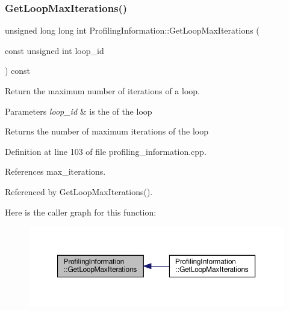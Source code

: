 \subsubsection{\texorpdfstring{Get\+Loop\+Max\+Iterations()}{GetLoopMaxIterations()}\hspace{0.1cm}{\footnotesize\ttfamily [1/2]}}
{\footnotesize\ttfamily unsigned long long int Profiling\+Information\+::\+Get\+Loop\+Max\+Iterations (\begin{DoxyParamCaption}\item[{const unsigned int}]{loop\+\_\+id }\end{DoxyParamCaption}) const}



Return the maximum number of iterations of a loop. 


\begin{DoxyParams}{Parameters}
{\em loop\+\_\+id} & is the of the loop \\
\hline
\end{DoxyParams}
\begin{DoxyReturn}{Returns}
the number of maximum iterations of the loop 
\end{DoxyReturn}


Definition at line 103 of file profiling\+\_\+information.\+cpp.



References max\+\_\+iterations.



Referenced by Get\+Loop\+Max\+Iterations().

Here is the caller graph for this function\+:
\nopagebreak
\begin{figure}[H]
\begin{center}
\leavevmode
\includegraphics[width=350pt]{dd/d5b/classProfilingInformation_a840efae2165a4271c99184e088bc38e4_icgraph}
\end{center}
\end{figure}
\mbox{\label{classProfilingInformation_a32103f572280605cf93ff372a1d1421f}} 
